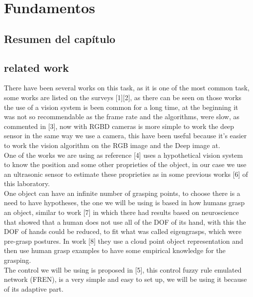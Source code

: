 \chapter{Fundamentos}

    \section{Resumen del capítulo}
    
    
    \section{related work}
    There have been several works on this task, as it is one of the most common task, some works are listed on the surveys [1][2], as there can be seen on those works the use of a vision system is been common for a long time, at the beginning it was not so recommendable as the frame rate and the algorithms, were slow, as commented in [3], now with RGBD cameras is more simple to work the deep sensor in the same way we use a camera, this have been useful because it’s easier to work the vision algorithm on the RGB image and the Deep image at.\\
    One of the works we are using as reference [4] uses a hypothetical vision system to know the position and some other proprieties of the object, in our case we use an ultrasonic sensor to estimate these proprieties as in some previous works [6] of this laboratory.\\
    One object can have an infinite number of grasping points, to choose there is a need to have hypotheses, the one we will be using is based in how humans grasp an object, similar to work [7] in which there had results based on neuroscience that showed that a human does not use all of the DOF of its hand, with this the DOF of hands could be reduced, to fit what was called eigengrasps, which were pre-grasp postures. In work [8] they use a cloud point object representation and then use human grasp examples to have some empirical knowledge for the grasping.\\
    The control we will be using is proposed in [5], this control fuzzy rule emulated network (FREN), is a very simple and easy to set up, we will be using it because of its adaptive part.\\
